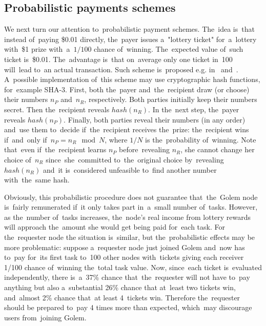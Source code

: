 \documentclass[a4paper]{article}
\begin{document}
\subsection{Probabilistic payments schemes}
    We next turn our attention to~probabilistic payment schemes. The~idea  is~that instead of~paying \$0.01 directly,
    the~payer issues a~"lottery ticket" for~a~lottery with~\$1 prize with~a~$1/100$ chance of~winning. The~expected
    value of~such ticket is~\$0.01. The~advantage is~that on~average only one ticket in~100 will~lead to~an actual
    transaction. Such scheme is~proposed e.g. in~\cite{RIVEST} and~\cite{WHEELER}.
    A~possible implementation of~this scheme may use cryptographic hash functions, for~example SHA-3. First, both
    the~payer and~the~recipient draw (or choose) their numbers $n_P$ and~$n_R$, respectively.
    Both parties initially keep their numbers secret. Then the~recipient reveals $hash(n_R)$. In the~next step,
    the~payer reveals $hash(n_P)$. Finally, both parties reveal their numbers (in any order) and~use them to~decide
    if~the~recipient receives the~prize: the~recipient wins if~and~only if~$n_P = n_R \mod N$, where $1/N$ is
    the~probability of~winning. Note that~even if~the~recipient learns $n_P$ before~revealing $n_R$, she cannot change
    her choice of~$n_R$ since~she~committed to~the~original choice by~revealing $hash(n_R)$ and~it is~considered
    unfeasible to~find another number with~the~same hash.

    Obviously, this probabilistic procedure does not guarantee that~the~Golem node is~fairly remunerated if~it only
    takes part in~a~small number of~tasks. However, as the~number of~tasks increases, the~node's real income from
    lottery rewards will approach the~amount she would get being paid for~each task. For the~requester node the
    situation is~similar, but the~probabilistic effects may be more problematic: suppose a~requester node just
    joined Golem and~now has to~pay for~its first task to~100 other nodes with~tickets giving each receiver
    1/100 chance of~winning the~total task value. Now, since~each ticket is~evaluated independently,
    there is~a~37\% chance that~the~requester will not have to~pay anything but also a~substantial 26\% chance that
    at~least two tickets win, and~almost 2\% chance that~at least 4~tickets win. Therefore the~requester should be
    prepared to~pay 4 times more than expected, which~may discourage users from~joining Golem.
\end{document}

